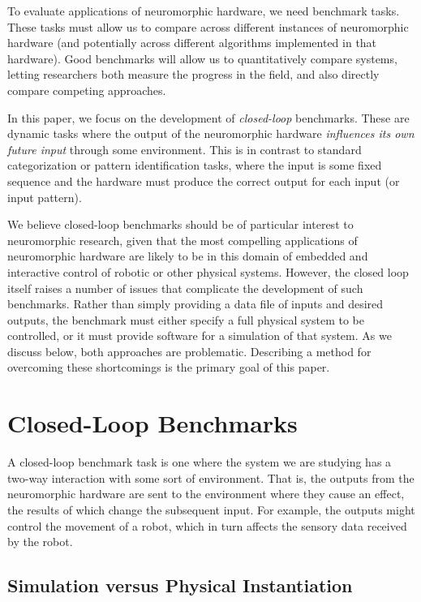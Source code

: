 \documentclass{frontiersSCNS} %
\begin{document}
To evaluate applications of neuromorphic hardware, we need benchmark tasks.  These
tasks must allow us to compare across different instances of neuromorphic
hardware (and potentially across different algorithms implemented in that
hardware).  Good benchmarks will allow us to quantitatively compare systems, letting
researchers both measure the progress in the field, and also directly
compare competing approaches.

In this paper, we focus on the development of \emph{closed-loop} benchmarks.
These are dynamic tasks where the output of the neuromorphic hardware \emph{influences
its own future input} through some environment.  This is in contrast to standard categorization or pattern
identification tasks, where the input is some fixed sequence and the hardware
must produce the correct output for each input (or input pattern).

We believe closed-loop benchmarks should be of particular interest to
neuromorphic research, given that the most compelling applications of neuromorphic
hardware are likely to be in this domain of embedded and interactive control
of robotic or other physical systems.  However, the closed loop itself raises a number
of issues that complicate the development of such benchmarks.  Rather than
simply providing a data file of inputs and desired outputs, the benchmark
must either specify a full physical system to be controlled, or it must 
provide software for a simulation of that system.  As we discuss below, both
approaches are problematic.  
Describing a method for overcoming these shortcomings is the primary goal of
this paper.


\section{Closed-Loop Benchmarks}

A closed-loop benchmark task is one where the system we are studying has a 
two-way interaction with some sort of environment.  That is, the outputs from
the neuromorphic hardware are sent to the environment where they cause
an effect, the results of which change the subsequent input.  For example,
the outputs might control the movement of a robot, which in turn affects the
sensory data received by the robot.

\subsection{Simulation versus Physical Instantiation}
\end{document}
